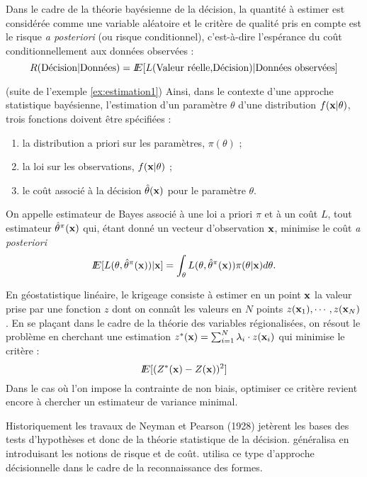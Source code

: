 Dans le cadre de la th\'eorie bay\'esienne de la d\'ecision, la quantit\'e
\`a estimer est consid\'er\'ee comme une variable al\'eatoire et
le crit\`ere  de qualit\'e pris en compte est le risque {\em a posteriori}
(ou risque conditionnel), c'est-\`a-dire l'esp\'erance du co\^ut conditionnellement 
aux donn\'ees observ\'ees : 
$$
R(\mbox{D\'ecision}|\mbox{Donn\'ees})=
I\!\!E[L(\mbox{Valeur r\'eelle,D\'ecision})| \mbox{Donn\'ees observ\'ees}]
$$ 
\begin{ex}
(suite de l'exemple \ref{ex:estimation1})
Ainsi, dans le contexte d'une approche statistique bay\'esienne,
l'estimation d'un param\`etre $\theta$ d'une distribution 
$f(\mbox{\bf x}|\theta)$,  trois fonctions doivent 
\^etre sp\'ecifi\'ees :
\begin{enumerate}
\item la distribution a priori sur les param\`etres, $\pi(\theta)$ ;
\item la loi sur les observations, $f(\mbox{\bf x}|\theta)$ ; 
\item le co\^ut associ\'e \`a la d\'ecision $\hat{\theta}(\mbox{\bf x})$ pour le
param\`etre $\theta$.
\end{enumerate}

On appelle estimateur de Bayes associ\'e \`a une loi a priori $\pi$
et \`a un co\^ut $L$, tout estimateur $\hat{\theta}^\pi(\mbox{\bf x})$ qui, 
\'etant donn\'e un vecteur d'observation $\mbox{\bf x}$, minimise le co\^ut {\em a posteriori} 
\[
I\!\!E[L(\theta,\hat{\theta}^\pi(\mbox{\bf x}))|\mbox{\bf x}]=
\int_\theta L(\theta,\hat{\theta}^\pi(\mbox{\bf x})) \pi(\theta | \mbox{\bf x}) d\theta.
\]
\end{ex}


\begin{ex}
En g\'eostatistique lin\'eaire, le krigeage consiste \`a estimer en un 
point $\mbox{\bf x}$ la valeur prise par une fonction $z$ dont on conna\^{\i}t 
les valeurs en $N$ points $z(\mbox{\bf x}_1),\cdots,z(\mbox{\bf x}_N)$. En se pla\c{c}ant 
dans le cadre de la th\'eorie des variables r\'egionalis\'ees, on 
r\'esout le probl\`eme en cherchant  une estimation
$z^*(\mbox{\bf x})=\sum_{i=1}^{N}\lambda_i \cdot z(\mbox{\bf x}_i)$  qui  minimise le crit\`ere :
\begin{equation}
I\!\!E[(Z^*(\mbox{\bf x})-Z(\mbox{\bf x}))^2]
\end{equation}
Dans le cas o\`u l'on impose la contrainte de non biais, 
optimiser ce crit\`ere revient encore \`a chercher un estimateur 
de variance minimal. 
\end{ex}  

Historiquement les travaux de Neyman et Pearson (1928) jet\`erent les
bases des tests d'hypoth\`eses et donc de la th\'eorie statistique 
de la d\'ecision.  g\'en\'eralisa  en
introduisant les notions de risque et de co\^ut.  
utilisa ce type d'approche d\'ecisionnelle dans le cadre de la
reconnaissance des formes. 

